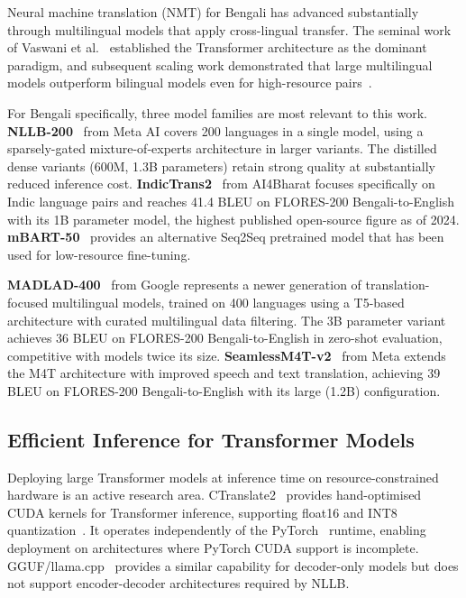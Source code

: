 \documentclass[conference]{IEEEtran}
\newcommand{\MADLADBLEU}{36}
\newcommand{\SEAMLESSBLEU}{39}
\begin{document}
Neural machine translation (NMT) for Bengali has advanced substantially through
multilingual models that apply cross-lingual transfer.
The seminal work of Vaswani et al.~\cite{vaswani2017attention} established the
Transformer architecture as the dominant paradigm, and subsequent scaling work
demonstrated that large multilingual models outperform bilingual models even for
high-resource pairs~\cite{arivazhagan2019massively}.

For Bengali specifically, three model families are most relevant to this work.
\textbf{NLLB-200}~\cite{nllb2022} from Meta AI covers 200 languages in a single model,
using a sparsely-gated mixture-of-experts architecture in larger variants.
The distilled dense variants (600M, 1.3B parameters) retain strong quality at
substantially reduced inference cost.
\textbf{IndicTrans2}~\cite{gala2023indictrans2} from AI4Bharat focuses specifically
on Indic language pairs and reaches 41.4 BLEU on FLORES-200 Bengali-to-English with
its 1B parameter model, the highest published open-source figure as of 2024.
\textbf{mBART-50}~\cite{liu2020multilingual} provides an alternative Seq2Seq
pretrained model that has been used for low-resource fine-tuning.

\textbf{MADLAD-400}~\cite{kudugunta2023madlad} from Google represents a newer
generation of translation-focused multilingual models, trained on 400 languages
using a T5-based architecture with curated multilingual data filtering.
The 3B parameter variant achieves \MADLADBLEU{} BLEU on FLORES-200 Bengali-to-English
in zero-shot evaluation, competitive with models twice its size.
\textbf{SeamlessM4T-v2}~\cite{seamlessm4t2023} from Meta extends the M4T architecture
with improved speech and text translation, achieving \SEAMLESSBLEU{} BLEU on
FLORES-200 Bengali-to-English with its large (1.2B) configuration.

\subsection{Efficient Inference for Transformer Models}

Deploying large Transformer models at inference time on resource-constrained hardware
is an active research area.
CTranslate2~\cite{ctranslate2_klein} provides hand-optimised CUDA kernels for
Transformer inference, supporting float16 and INT8 quantization~\cite{dettmers2022llmint8}.
It operates independently of the PyTorch~\cite{pytorch2024} runtime, enabling deployment
on architectures where PyTorch CUDA support is incomplete.
GGUF/llama.cpp~\cite{llamacpp} provides a similar capability for decoder-only models
but does not support encoder-decoder architectures required by NLLB.
\end{document}
